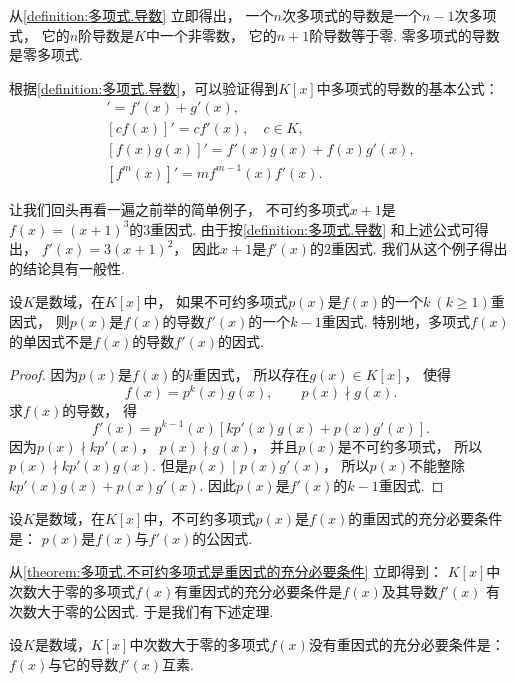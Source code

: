 从\cref{definition:多项式.导数} 立即得出，
一个\(n\)次多项式的导数是一个\(n-1\)次多项式，
它的\(n\)阶导数是\(K\)中一个非零数，
它的\(n+1\)阶导数等于零.
零多项式的导数是零多项式.

根据\cref{definition:多项式.导数}，可以验证得到\(K[x]\)中多项式的导数的基本公式：\begin{gather}
	[f(x)+g(x)]' = f'(x) + g'(x), \\
	[c f(x)]' = c f'(x), \quad c \in K, \\
	[f(x) g(x)]' = f'(x) g(x) + f(x) g'(x), \\
	[f^m(x)]' = m f^{m-1}(x) f'(x).
\end{gather}

让我们回头再看一遍之前举的简单例子，
不可约多项式\(x+1\)是\(f(x) = (x+1)^3\)的\(3\)重因式.
由于按\cref{definition:多项式.导数} 和上述公式可得出，
\(f'(x) = 3(x+1)^2\)，
因此\(x+1\)是\(f'(x)\)的\(2\)重因式.
我们从这个例子得出的结论具有一般性.

\begin{theorem}\label{theorem:多项式.多项式及其导数的重因式}
设\(K\)是数域，在\(K[x]\)中，
如果不可约多项式\(p(x)\)是\(f(x)\)的一个\(k\ (k\geq1)\)重因式，
则\(p(x)\)是\(f(x)\)的导数\(f'(x)\)的一个\(k-1\)重因式.
特别地，多项式\(f(x)\)的单因式不是\(f(x)\)的导数\(f'(x)\)的因式.
\begin{proof}
因为\(p(x)\)是\(f(x)\)的\(k\)重因式，
所以存在\(g(x) \in K[x]\)，
使得\[
	f(x) = p^k(x) g(x), \qquad
	p(x) \nmid g(x).
\]
求\(f(x)\)的导数，
得\[
	f'(x) = p^{k-1}(x) [ k p'(x) g(x) + p(x) g'(x) ].
\]
因为\(p(x) \nmid k p'(x)\)，
\(p(x) \nmid g(x)\)，
并且\(p(x)\)是不可约多项式，
所以\(p(x) \nmid k p'(x) g(x)\).
但是\(p(x) \mid p(x) g'(x)\)，
所以\(p(x)\)不能整除\(k p'(x) g(x) + p(x) g'(x)\).
因此\(p(x)\)是\(f'(x)\)的\(k-1\)重因式.
\end{proof}
\end{theorem}

\begin{corollary}\label{theorem:多项式.不可约多项式是重因式的充分必要条件}
设\(K\)是数域，在\(K[x]\)中，不可约多项式\(p(x)\)是\(f(x)\)的重因式的充分必要条件是：
\(p(x)\)是\(f(x)\)与\(f'(x)\)的公因式.
\end{corollary}
从\cref{theorem:多项式.不可约多项式是重因式的充分必要条件} 立即得到：
\(K[x]\)中次数大于零的多项式\(f(x)\)有重因式的充分必要条件是\(f(x)\)及其导数\(f'(x)\)
有次数大于零的公因式.
于是我们有下述定理.
\begin{theorem}\label{theorem:多项式.高次多项式没有重因式的充分必要条件}
设\(K\)是数域，\(K[x]\)中次数大于零的多项式\(f(x)\)没有重因式的充分必要条件是：
\(f(x)\)与它的导数\(f'(x)\)互素.
\end{theorem}

